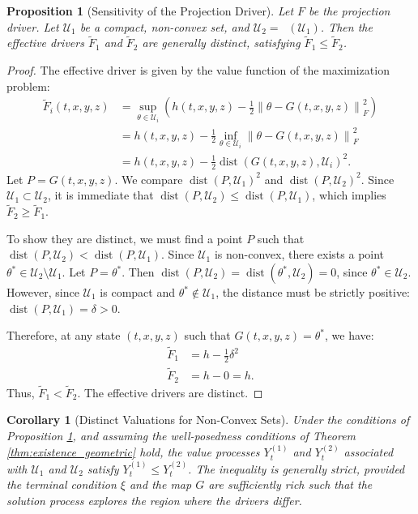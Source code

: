 \documentclass[12pt, letterpaper]{amsart}
\newcommand{\Ucal}{\mathcal{U}}
\newcommand{\norm}[1]{\left\lVert#1\right\rVert}
\DeclareMathOperator*{\dist}{dist}
\DeclareMathOperator*{\overlineconv}{\overline{conv}}
\theoremstyle{plain}
\newtheorem{proposition}[theorem]{Proposition}
\newtheorem{corollary}[theorem]{Corollary}
\theoremstyle{definition}
\theoremstyle{remark}
\numberwithin{equation}{section} %
\begin{document}
\begin{proposition}[Sensitivity of the Projection Driver]
\label{prop:sensitivity_projection}
Let \(F\) be the projection driver. Let \(\Ucal_1\) be a compact, non-convex set, and \(\Ucal_2 = \overlineconv(\Ucal_1)\). Then the effective drivers \(\tilde{F}_1\) and \(\tilde{F}_2\) are generally distinct, satisfying \(\tilde{F}_1 \le \tilde{F}_2\).
\end{proposition}

\begin{proof}
The effective driver is given by the value function of the maximization problem:
\begin{align*}
    \tilde{F}_i(t,x,y,z) &= \sup_{\theta \in \Ucal_i} \left( h(t,x,y,z) - \frac{1}{2}\norm{\theta - G(t,x,y,z)}_F^2 \right) \\
    &= h(t,x,y,z) - \frac{1}{2} \inf_{\theta \in \Ucal_i} \norm{\theta - G(t,x,y,z)}_F^2 \\
    &= h(t,x,y,z) - \frac{1}{2} \dist(G(t,x,y,z), \Ucal_i)^2.
\end{align*}
Let \(P = G(t,x,y,z)\). We compare \(\dist(P, \Ucal_1)^2\) and \(\dist(P, \Ucal_2)^2\).
Since \(\Ucal_1 \subset \Ucal_2\), it is immediate that \(\dist(P, \Ucal_2) \le \dist(P, \Ucal_1)\), which implies \(\tilde{F}_2 \ge \tilde{F}_1\).

To show they are distinct, we must find a point \(P\) such that \(\dist(P, \Ucal_2) < \dist(P, \Ucal_1)\). Since \(\Ucal_1\) is non-convex, there exists a point \(\theta^* \in \Ucal_2 \setminus \Ucal_1\). Let \(P = \theta^*\).
Then \(\dist(P, \Ucal_2) = \dist(\theta^*, \Ucal_2) = 0\), since \(\theta^* \in \Ucal_2\).
However, since \(\Ucal_1\) is compact and \(\theta^* \notin \Ucal_1\), the distance must be strictly positive: \(\dist(P, \Ucal_1) = \delta > 0\).

Therefore, at any state \((t,x,y,z)\) such that \(G(t,x,y,z) = \theta^*\), we have:
\begin{align*}
    \tilde{F}_1 &= h - \frac{1}{2}\delta^2 \\
    \tilde{F}_2 &= h - 0 = h.
\end{align*}
Thus, \(\tilde{F}_1 < \tilde{F}_2\). The effective drivers are distinct.
\end{proof}

\begin{corollary}[Distinct Valuations for Non-Convex Sets]
Under the conditions of Proposition \ref{prop:sensitivity_projection}, and assuming the well-posedness conditions of Theorem \ref{thm:existence_geometric} hold, the value processes \(Y^{(1)}_t\) and \(Y^{(2)}_t\) associated with \(\Ucal_1\) and \(\Ucal_2\) satisfy \(Y^{(1)}_t \le Y^{(2)}_t\). The inequality is generally strict, provided the terminal condition $\xi$ and the map $G$ are sufficiently rich such that the solution process explores the region where the drivers differ.
\end{corollary}
\end{document}
